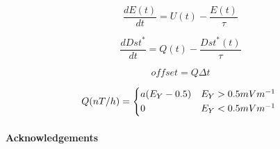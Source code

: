 \documentclass[a4paper]{article}
\theoremstyle{plain}
\theoremstyle{definition}
\begin{document}
	\begin{equation}
		\frac{d E(t)}{d t} = U(t) - \frac{E(t)}{\tau}
	\end{equation}
	
	\begin{equation}
		\frac{d Dst^*}{dt} = Q(t) - \frac{Dst^* (t)}{\tau}	
	\end{equation}
	
	\begin{equation}
		offset = Q \Delta t
	\end{equation}
	
	  \begin{equation}
		Q(nT / h) =
		\begin{cases*}
			a(E_Y - 0.5) & $E_Y > 0.5 mV m^{-1}$ \\
			0       &$ E_Y < 0.5 mV m^{-1}$
		\end{cases*}
	\end{equation}
	
	\paragraph{Acknowledgements} \lipsum[6]
	
	
	
	\appendix
	

	
\end{document}
